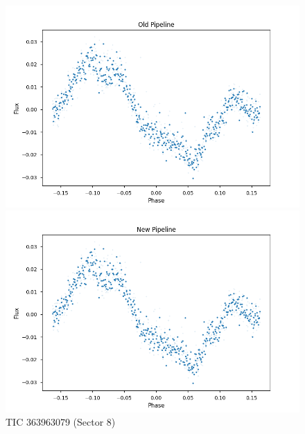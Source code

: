 \documentclass{article}
\begin{document}
\begin{figure}[h!]
    \centering
    \begin{minipage}{0.45\textwidth}
        \centering
        \includegraphics[width=\textwidth]{./figures/1_old.png}
    \end{minipage}%
    \hfill
    \begin{minipage}{0.45\textwidth}
        \centering
        \includegraphics[width=\textwidth]{./figures/1_new.png}
    \end{minipage}
    \caption{TIC 363963079 (Sector 8)}
\end{figure}
\end{document}
